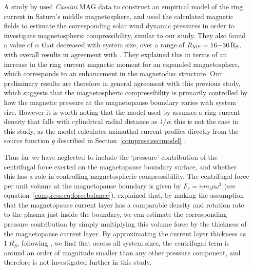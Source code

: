 A study by \citet{bunce2007} used \textit{Cassini} MAG data to construct an empirical model of the ring current in Saturn's middle magnetosphere, and used the calculated magnetic fields to estimate the corresponding solar wind dynamic pressures in order to investigate magnetospheric compressibility, similar to our study. They also found a value of $\alpha$ that decreased with system size, over a range of $R_\mathrm{MP} = 16{\--}\SI{30}{R_S}$, with overall results in agreement with \citet{arridge2006}. They explained this in terms of an increase in the ring current magnetic moment for an expanded magnetosphere, which corresponds to an enhancement in the magnetodisc structure. Our preliminary results are therefore in general agreement with this previous study, which suggests that the magnetospheric compressibility is primarily controlled by how the magnetic pressure at the magnetopause boundary varies with system size. However it is worth noting that the model used by \citet{bunce2007} assumes a ring current density that falls with cylindrical radial distance as $1/\rho$; this is not the case in this study, as the \citet{achilleos2010a} model calculates azimuthal current profiles directly from the source function $g$ described in Section~\ref{compress:sec:model} \cite[see][]{caudal1986, achilleos2010a}.

Thus far we have neglected to include the `pressure' contribution of the centrifugal force exerted on the magnetopause boundary surface, and whether this has a role in controlling magnetospheric compressibility. The centrifugal force per unit volume at the magnetopause boundary is given by $F_c = nm_i\rho\omega^2$ (see equation~\ref{compress:eq:forcebalance}). \citet{pilkington2014} explained that, by making the assumption that the magnetopause current layer has a comparable density and rotation rate to the plasma just inside the boundary, we can estimate the corresponding pressure contribution by simply multiplying this volume force by the thickness of the magnetopause current layer. By approximating the current layer thickness as $\SI{1}{R_S}$, following \citet{masters2011}, we find that across all system sizes, the centrifugal term is around an order of magnitude smaller than any other pressure component, and therefore is not investigated further in this study.

